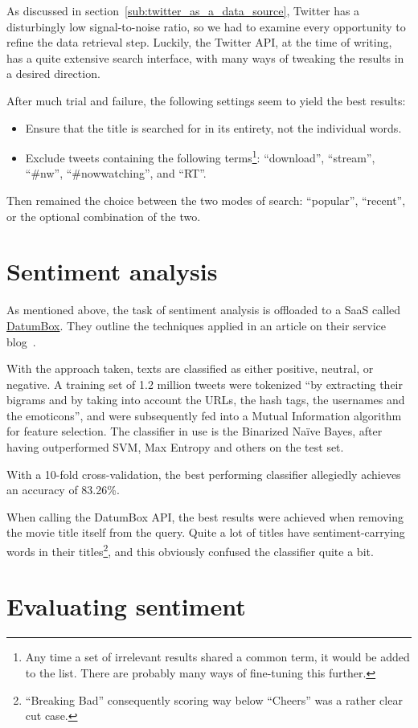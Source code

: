 As discussed in section~\ref{sub:twitter_as_a_data_source}, Twitter has a disturbingly low signal-to-noise ratio, so we had to examine every opportunity to refine the data retrieval step.
Luckily, the Twitter API, at the time of writing, has a quite extensive search interface, with many ways of tweaking the results in a desired direction.

After much trial and failure, the following settings seem to yield the best results:

\begin{itemize}
  \item Ensure that the title is searched for in its entirety, not the individual words.
  \item Exclude tweets containing the following terms\footnote{Any time a set of irrelevant results shared a common term, it would be added to the list. There are probably many ways of fine-tuning this further.}: ``download'', ``stream'', ``#nw'', ``#nowwatching'', and ``RT''.
\end{itemize}

Then remained the choice between the two modes of search: ``popular'', ``recent'', or the optional combination of the two.



\section{Sentiment analysis} %
\label{sec:sentiment_analysis}

As mentioned above, the task of sentiment analysis is offloaded to a SaaS called \url{DatumBox}. They outline the techniques applied in an article on their service blog~\cite{DatumBoxTwitterSentiment}.

With the approach taken, texts are classified as either positive, neutral, or negative.
A training set of 1.2 million tweets were tokenized ``by extracting their bigrams and by taking into account the URLs, the hash tags, the usernames and the emoticons'', and were subsequently fed into a Mutual Information algorithm for feature selection.
The classifier in use is the Binarized Naïve Bayes, after having outperformed SVM, Max Entropy and others on the test set.

With a 10-fold cross-validation, the best performing classifier allegiedly achieves an accuracy of 83.26\%.

When calling the DatumBox API, the best results were achieved when removing the movie title itself from the query.
Quite a lot of titles have sentiment-carrying words in their titles\footnote{``Breaking Bad'' consequently scoring way below ``Cheers'' was a rather clear cut case.}, and this obviously confused the classifier quite a bit.


\section{Evaluating sentiment} %
\label{sec:evaluating_sentiment}



